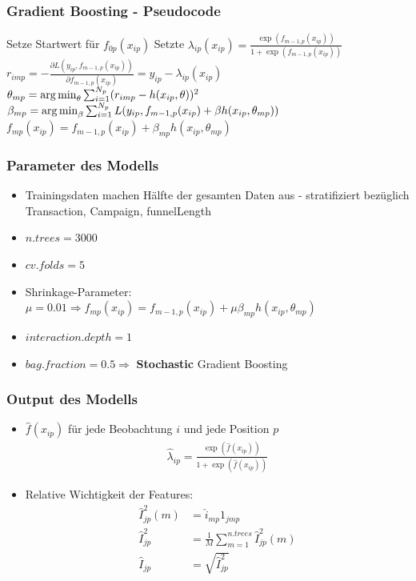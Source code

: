 \begin{frame}\frametitle{Gradient Boosting - Pseudocode}
		\begin{algorithmic}
		\STATE Setze Startwert für $f_{0p}(x_{ip})$
			\STATE Setzte $\lambda_{ip}(x_{ip}) = \frac{\exp(f_{m-1,p}(x_{ip}))}{1+\exp(f_{m-1,p}(x_{ip}))}$
				\STATE $r_{imp} = - \frac{\partial L(y_{ip},f_{m-1,p}(x_{ip}))}{\partial f_{m-1,p}(x_{ip})} = y_{ip} - \lambda_{ip}(x_{ip})$
			\ENDFOR
			\STATE $\theta_{mp} = \operatorname*{arg\,min}_{\theta} \sum_{i=1}^{N_p} (r_{imp} - h(x_{ip}, \theta))^2$
			\STATE $\beta_{mp} = \operatorname*{arg\,min}_{\beta} \sum_{i=1}^{N_p} L(y_{ip}, f_{m-1,p}(x_{ip}) + \beta h(x_{ip},\theta_{mp}))$
			\STATE $f_{mp}(x_{ip}) = f_{m-1,p}(x_{ip}) + \beta_{mp} h(x_{ip},\theta_{mp})$
		\ENDFOR
		\end{algorithmic}
\end{frame}

\begin{frame}\frametitle{Parameter des Modells}
	\begin{itemize}
		\item Trainingsdaten machen Hälfte der gesamten Daten aus - stratifiziert bezüglich Transaction, Campaign, funnelLength
		\item $n.trees=3000$
		\item $cv.folds=5$
		\item Shrinkage-Parameter: $\mu = 0.01 \Rightarrow f_{mp}(x_{ip}) = f_{m-1,p}(x_{ip}) + \mu \beta_{mp} h(x_{ip},\theta_{mp})$
		\item $interaction.depth=1$
		\item $bag.fraction=0.5 \Rightarrow$ \textbf{Stochastic} Gradient Boosting
	\end{itemize}
\end{frame}

\begin{frame}\frametitle{Output des Modells}
	\begin{itemize}
		\item $\hat{f}(x_{ip})$ für jede Beobachtung $i$ und jede Position $p$
			\begin{align*}
				\hat{\lambda}_{ip} = \frac{\exp(\hat{f}(x_{ip}))}{1+\exp(\hat{f}(x_{ip}))}
			\end{align*}
		\item Relative Wichtigkeit der Features:
			\begin{align*}
				\hat{I}_{jp}^2(m) &= \hat{i}_{mp} 1_{jmp}\\
				\hat{I}_{jp}^2 &= \frac{1}{M} \sum_{m=1}^{n.trees} \hat{I}_{jp}^2(m)\\
				\hat{I}_{jp} &= \sqrt{\hat{I}_{jp}^2}
			\end{align*}
	\end{itemize}
\end{frame}

